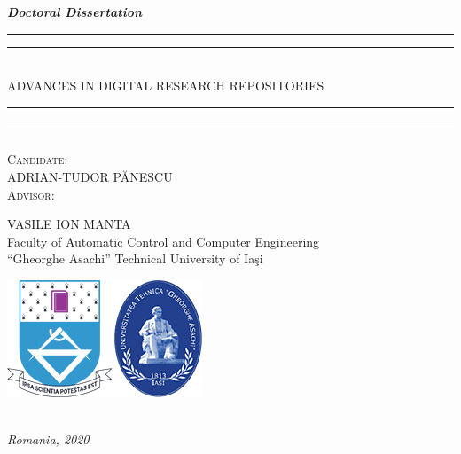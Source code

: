 
\begin{titlepage}
  \centering
  \vspace*{\baselineskip}
  \textbf{\textit{Doctoral Dissertation}}
  \\\vspace*{\baselineskip}
  \rule{\textwidth}{1.6pt}\vspace*{-\baselineskip}\vspace*{2pt}
  \rule{\textwidth}{0.4pt}\\[\baselineskip]
  {ADVANCES IN DIGITAL RESEARCH REPOSITORIES}
  \rule{\textwidth}{0.4pt}\vspace*{-\baselineskip}\vspace*{2pt}
  \rule{\textwidth}{1.6pt}\\[\baselineskip]
  \scshape
  \vspace*{4\baselineskip}
  Candidate:
  \\\vspace*{\baselineskip}
  ADRIAN-TUDOR P\u{A}NESCU
  \\\vspace*{4\baselineskip}
  Advisor:
  \\\vspace*{\baselineskip}
  \begin{minipage}{0.9\textwidth}
    \centering
    VASILE ION MANTA\\
    Faculty of Automatic Control and Computer Engineering\\``Gheorghe Asachi'' Technical University of Ia\c{s}i
  \end{minipage}
  \vfill
  \begin{minipage}{0.8\textwidth}
    \centering
    \includegraphics[scale=0.7]{figures/logo.png}
  \end{minipage}
  \\\vspace*{2\baselineskip}
  \textit{Romania, 2020}
\end{titlepage}
